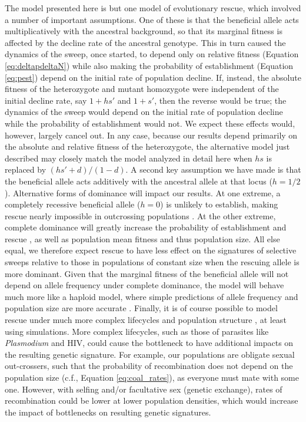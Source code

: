 \documentclass[]{article}
\begin{document}
The model presented here is but one model of evolutionary rescue, which involved a number of important assumptions.
One of these is that the beneficial allele acts multiplicatively with the ancestral background, so that its marginal fitness is affected by the decline rate of the ancestral genotype.
This in turn caused the dynamics of the sweep, once started, to depend only on relative fitness (Equation \ref{eq:deltapdeltaN}) while also making the probability of establishment (Equation \ref{eq:pest}) depend on the initial rate of population decline.
If, instead, the absolute fitness of the heterozygote and mutant homozygote were independent of the initial decline rate, say $1 + h s'$ and $1 + s'$, then the reverse would be true; the dynamics of the sweep would depend on the initial rate of population decline while the probability of establishment would not. 
We expect these effects would, however, largely cancel out.
In any case, because our results depend primarily on the absolute and relative fitness of the heterozygote, the alternative model just described may closely match the model analyzed in detail here when $h s$ is replaced by $(h s'+d)/(1-d)$.
A second key assumption we have made is that the beneficial allele acts additively with the ancestral allele at that locus ($h=1/2$).
Alternative forms of dominance will impact our results.
At one extreme, a completely recessive beneficial allele ($h=0$) is unlikely to establish, making rescue nearly impossible in outcrossing populations \citep{uecker2017evolutionary}.
At the other extreme, complete dominance will greatly increase the probability of establishment and rescue \citep{uecker2017evolutionary}, as well as population mean fitness and thus population size.
All else equal, we therefore expect rescue to have less effect on the signatures of selective sweeps relative to those in populations of constant size when the rescuing allele is more dominant.
Given that the marginal fitness of the beneficial allele will not depend on allele frequency under complete dominance, the model will behave much more like a haploid model, where simple predictions of allele frequency and population size are more accurate \citep{orr2014population}.
Finally, it is of course possible to model rescue under much more complex lifecycles and population structure \citep[e.g., as expected for the evolution of malarial drug resistance;][]{kim2014population}, at least using simulations. 
More complex lifecycles, such as those of parasites like \textit{Plasmodium} and HIV, could cause the bottleneck to have additional impacts on the resulting genetic signature. 
For example, our populations are obligate sexual out-crossers, such that the probability of recombination does not depend on the population size (c.f., Equation \ref{eq:coal_rates}), as everyone must mate with some one. 
However, with selfing and/or facultative sex (genetic exchange), rates of recombination could be lower at lower population densities, which would increase the impact of bottlenecks on resulting genetic signatures.
\end{document}
